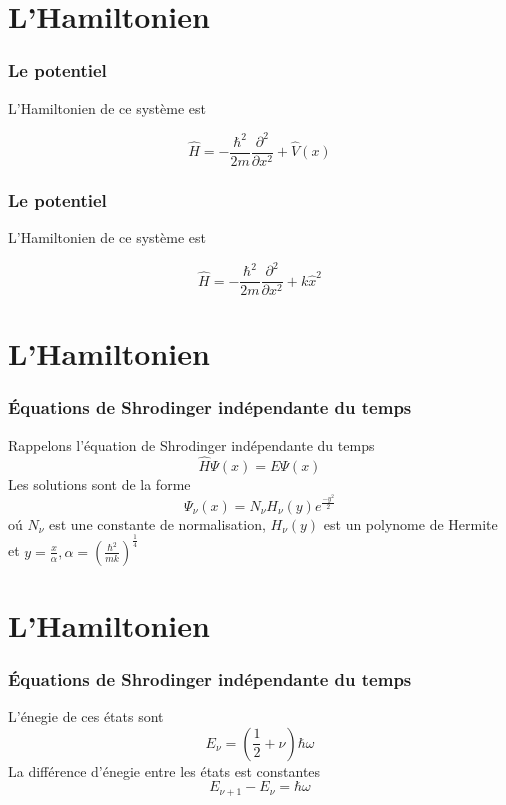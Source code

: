 \documentclass[aspectratio=169]{beamer}
\begin{document}

\section{L'Hamiltonien}
\begin{frame}
\frametitle{Le potentiel}

L'Hamiltonien de ce système est

\begin{equation}\tag{2}
\hat{H}=-\frac{\hbar^2}{2m}\frac{\partial^2}{\partial x^2}+\hat{V}(x)
\end{equation} 


\end{frame}


\begin{frame}
\frametitle{Le potentiel}


L'Hamiltonien de ce système est

\begin{equation}\tag{2}
\hat{H}=-\frac{\hbar^2}{2m}\frac{\partial^2}{\partial x^2}+k\hat{x}^2
\end{equation} 



\end{frame}

\section{L'Hamiltonien}
\begin{frame}
\frametitle{Équations de Shrodinger indépendante du temps}
Rappelons l'équation de Shrodinger indépendante du temps
\begin{equation}
\hat{H}\Psi(x)=E\Psi(x)
\end{equation}
Les solutions sont de la forme
\begin{equation}
\Psi_{\nu}(x)=N_{\nu}H_{\nu}(y)e^{\frac{-y^2}{2}}
\end{equation}
o\'u $N_{\nu}$ est une constante de normalisation, $H_{\nu}(y)$ est un polynome de Hermite et $y=\frac{x}{\alpha}, \alpha=(\frac{\hbar^2}{mk})^{\frac{1}{4}}$

\end{frame}


\section{L'Hamiltonien}
\begin{frame}
\frametitle{Équations de Shrodinger indépendante du temps}
L'énegie de ces états sont 
\begin{equation}
E_{\nu}=\left(\frac{1}{2}+\nu\right)\hbar\omega
\end{equation}
La différence d'énegie entre les états est constantes
\begin{equation}
E_{\nu+1}-E_{\nu}=\hbar \omega
\end{equation}
\end{frame}
\end{document}
